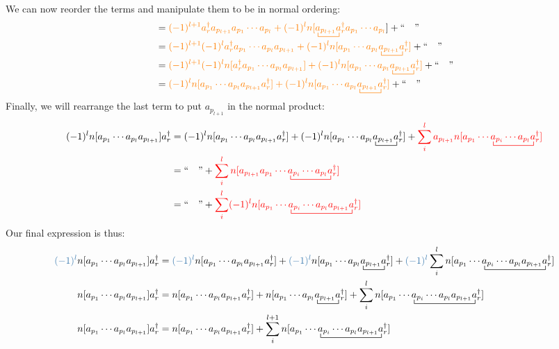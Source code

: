 \documentclass{article}
\newcommand{\ctr}{\bcontraction}
\newcommand{\dg}{\ensuremath{^\dagger} }
\newcommand{\cd}{\ensuremath{\cdots} }
\def\cb#1{{\color{blue}#1}}
\def\co#1{{\color{orange}#1}}
\def\cre#1{{\color{red}#1}}
\begin{document}
We can now reorder the terms and manipulate them to be in normal ordering: 
\begin{align*}
&= \co{  (-1)^{l+1}  a_r\dg a_{p_{l + 1}} a_{p_1} \cd a_{p_l}+  (-1)^l n[\ctr{}{a}{{}_{p_{l + 1}}}{a} a_{p_{l + 1}} a_r\dg a_{p_1} \cd a_{p_l}}] +  ``\quad" \\
&= \co{(-1)^{l+1}(-1)^l a_r\dg  a_{p_1} \cd a_{p_l} a_{p_{l + 1}}  + (-1)^l n[a_{p_1} \cd a_{p_l}  \ctr{}{a}{{}_{p_{l + 1}}}{a} a_{p_{l + 1}} a_r\dg ]} +  ``\quad"  \\
&= \co{(-1)^{l+1}(-1)^l n[a_r\dg  a_{p_1} \cd a_{p_l} a_{p_{l + 1}} ] + (-1)^l n[a_{p_1} \cd a_{p_l}  \ctr{}{a}{{}_{p_{l + 1}}}{a} a_{p_{l + 1}} a_r\dg ]} +``\quad" \\
&= \co{(-1)^l n[ a_{p_1} \cd a_{p_l} a_{p_{l + 1}} a_r\dg  ] + (-1)^l n[a_{p_1} \cd a_{p_l}  \ctr{}{a}{{}_{p_{l + 1}}}{a} a_{p_{l + 1}} a_r\dg ]} +``\quad"  \\
\end{align*} 
Finally, we will rearrange the last term to put $a_{p_{l+1}}$ in the normal product: 
\begin{align*}
(-1)^l n[a_{p_1} \cd a_{p_l} a_{p_{l + 1}} ]a_r\dg 
&= (-1)^l n[ a_{p_1} \cd a_{p_l}a_{p_{l + 1}} a_r\dg  ] + (-1)^l n[a_{p_1} \cd a_{p_l}  \ctr{}{a}{{}_{p_{l + 1}}}{a} a_{p_{l + 1}} a_r\dg ] + \cre{\sum_i^l a_{p_{l + 1}}  n[\ctr{a_{p_1} \cd}{a}{{}_{p_i} \cd a_{p_l}}{a} a_{p_1} \cd a_{p_i} \cd a_{p_l} a_r\dg]} \\
&= ``\quad" +  \cre{\sum_i^l   n[a_{p_{l + 1}} \ctr{a_{p_1} \cd}{a}{{}_{p_i} \cd a_{p_l}}{a} a_{p_1} \cd a_{p_i} \cd a_{p_l} a_r\dg]} \\
&= ``\quad"  + \cre{\sum_i^l (-1)^l n[ \ctr{a_{p_1} \cd}{a}{{}_{p_i} \cd a_{p_l} a_{p_{l+1}}}{a} a_{p_1} \cd a_{p_i} \cd a_{p_l} a_{p_{l+1}} a_r\dg]} \\
\end{align*}
Our final expression is thus:
\begin{align*}
\cb{(-1)^l} n[a_{p_1} \cd a_{p_l} a_{p_{l + 1}} ]a_r\dg    &=  \cb{(-1)^l}n[ a_{p_1} \cd a_{p_l}a_{p_{l + 1}} a_r\dg  ]+  \cb{(-1)^l} n[a_{p_1} \cd a_{p_l}  \ctr{}{a}{{}_{p_{l + 1}}}{a} a_{p_{l + 1}} a_r\dg ] +  \cb{(-1)^l} \sum_i^l n[ \ctr{a_{p_1} \cd}{a}{{}_{p_i} \cd a_{p_l} a_{p_{l+1}}}{a} a_{p_1} \cd a_{p_i} \cd a_{p_l} a_{p_{l+1}} a_r\dg] \\
n[a_{p_1} \cd a_{p_l} a_{p_{l + 1}} ]a_r\dg    &= n[ a_{p_1} \cd a_{p_l}a_{p_{l + 1}} a_r\dg  ] +  n[a_{p_1} \cd a_{p_l}  \ctr{}{a}{{}_{p_{l + 1}}}{a} a_{p_{l + 1}} a_r\dg ]  +   \sum_i^l n[ \ctr{a_{p_1} \cd}{a}{{}_{p_i} \cd a_{p_l} a_{p_{l+1}}}{a} a_{p_1} \cd a_{p_i} \cd a_{p_l} a_{p_{l+1}} a_r\dg] \\
n[a_{p_1} \cd a_{p_l} a_{p_{l + 1}} ]a_r\dg  &= n[ a_{p_1} \cd a_{p_l}a_{p_{l + 1}} a_r\dg  ] +  
\sum_i^{l+1} n[ \ctr{a_{p_1} \cd}{a}{{}_{p_i} \cd a_{p_l} a_{p_{l+1}}}{a} a_{p_1} \cd a_{p_i} \cd a_{p_l} a_{p_{l+1}} a_r\dg]
\end{align*}  
\end{document}
